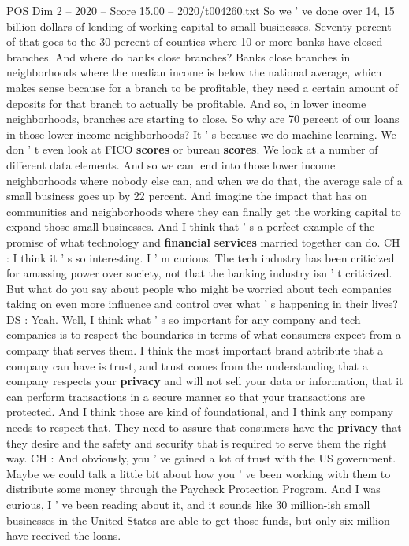 \begin{textsample}{POS Dim 2 – 2020 – Score 15.00 – 2020/t004260.txt}
So we ' ve done over 14, 15 billion dollars of lending of working capital to small businesses.
Seventy percent of that goes to the 30 percent of counties where 10 or more banks have closed branches.
And where do banks close branches?
Banks close branches in neighborhoods where the median income is below the national average, which makes sense because for a branch to be profitable, they need a certain amount of deposits for that branch to actually be profitable.
And so, in lower income neighborhoods, branches are starting to close.
So why are 70 percent of our loans in those lower income neighborhoods?
It ' s because we do machine learning.
We don ' t even look at FICO \textbf{scores} or bureau \textbf{scores}.
We look at a number of different data elements.
And so we can lend into those lower income neighborhoods where nobody else can, and when we do that, the average sale of a small business goes up by 22 percent.
And imagine the impact that has on communities and neighborhoods where they can finally get the working capital to expand those small businesses.
And I think that ' s a perfect example of the promise of what technology and \textbf{financial} \textbf{services} married together can do.
CH : I think it ' s so interesting.
I ' m curious.
The tech industry has been criticized for amassing power over society, not that the banking industry isn ' t criticized.
But what do you say about people who might be worried about tech companies taking on even more influence and control over what ' s happening in their lives?
DS : Yeah.
Well, I think what ' s so important for any company and tech companies is to respect the boundaries in terms of what consumers expect from a company that serves them.
I think the most important brand attribute that a company can have is trust, and trust comes from the understanding that a company respects your \textbf{privacy} and will not sell your data or information, that it can perform transactions in a secure manner so that your transactions are protected.
And I think those are kind of foundational, and I think any company needs to respect that.
They need to assure that consumers have the \textbf{privacy} that they desire and the safety and security that is required to serve them the right way.
CH : And obviously, you ' ve gained a lot of trust with the US government.
Maybe we could talk a little bit about how you ' ve been working with them to distribute some money through the Paycheck Protection Program.
And I was curious, I ' ve been reading about it, and it sounds like 30 million-ish small businesses in the United States are able to get those funds, but only six million have received the loans.

\end{textsample}
